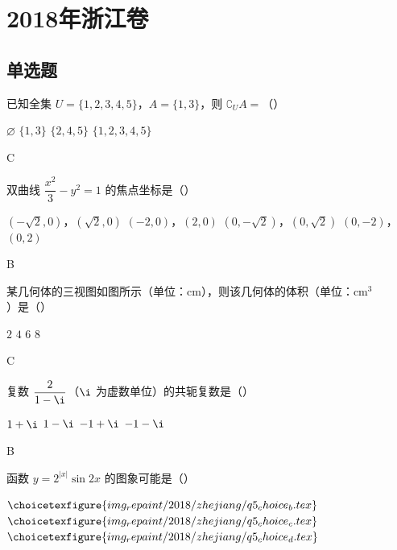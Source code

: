 \chapter{2018年浙江卷}

\section{单选题}

\begin{problem}
已知全集 \(U=\{1,2,3,4,5\}\)，\(A=\{1,3\}\)，则 \(\complement_U A=\)（\quad）

\choices
    {\(\varnothing\)}
    {\(\{1,3\}\)}
    {\(\{2,4,5\}\)}
    {\(\{1,2,3,4,5\}\)}
\end{problem}

\begin{answer}
C
\end{answer}

\begin{problem}
双曲线 \(\dfrac{x^2}{3}-y^2=1\) 的焦点坐标是（\quad）

\choices
    {\((-\sqrt2,0)\)，\((\sqrt2,0)\)}
    {\((-2,0)\)，\((2,0)\)}
    {\((0,-\sqrt2)\)，\((0,\sqrt2)\)}
    {\((0,-2)\)，\((0,2)\)}
\end{problem}

\begin{answer}
B
\end{answer}

\begin{problem}
某几何体的三视图如图所示（单位：\(\mathrm{cm}\)），则该几何体的体积（单位：\(\mathrm{cm}^3\)）是（\quad）


\choices
    {\(2\)}
    {\(4\)}
    {\(6\)}
    {\(8\)}
\end{problem}

\begin{answer}
C
\end{answer}

\begin{problem}
复数 \(\dfrac{2}{1-\i}\)（\(\i\) 为虚数单位）的共轭复数是（\quad）

\choices
    {\(1+\i\)}
    {\(1-\i\)}
    {\(-1+\i\)}
    {\(-1-\i\)}
\end{problem}

\begin{answer}
B
\end{answer}

\begin{problem}
函数 \(y=2^{|x|}\sin 2x\) 的图象可能是（\quad）

    {\(\choicetexfigure{img_repaint/2018/zhejiang/q5_choice_b.tex}\)}
    {\(\choicetexfigure{img_repaint/2018/zhejiang/q5_choice_c.tex}\)}
    {\(\choicetexfigure{img_repaint/2018/zhejiang/q5_choice_d.tex}\)}
\end{problem}

